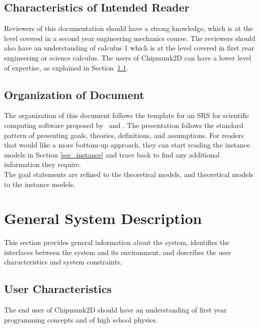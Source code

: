 \documentclass[12pt]{article}
\begin{document}
\subsection{Characteristics of Intended Reader}
\label{Sec_CharofInteRead}
Reviewers of this documentation should have a strong knowledge, which is at the level covered in a second year engineering mechanics course. The reviewers should also have an understanding of calculus 1 which is at the level covered in first year engineering or science calculus. The users of Chipmunk2D can have a lower level of expertise, as explained in Section~\ref{Sec_UserChar}.

\subsection{Organization of Document}
The organization of this document follows the template for an SRS for scientific
computing software proposed by~\cite{Koothoor2013} and \cite{SmithAndLai2005}.
The presentation follows the standard pattern of presenting goals, theories,
definitions, and assumptions.  For readers that would like a more bottom-up
approach, they can start reading the instance models in Section
\ref{sec_instance} and trace back to find any additional information they
require. \\
\newline
The goal statements are refined to the theoretical models, and theoretical
models to the instance models.  


%
%

\section{General System Description}

This section provides general information about the system,
identifies the interfaces between the system and its environment, and describes
the user characteristics and system constraints.

\subsection{User Characteristics}
\label{Sec_UserChar}

The end user of Chipmunk2D should have an understanding 
of first year programming concepts and of high school
physics.
\end{document}

